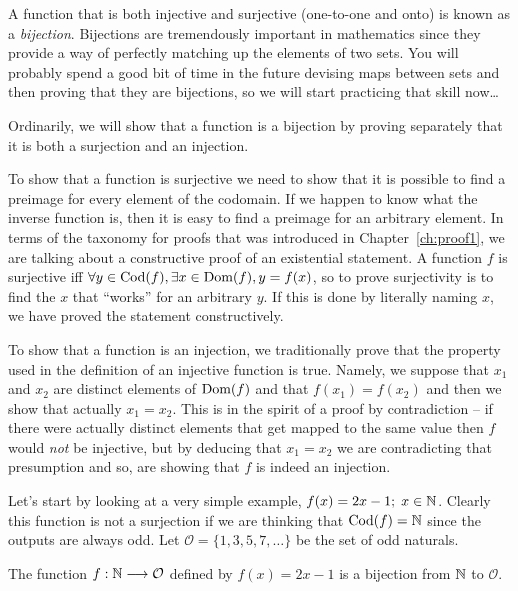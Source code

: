 A function that is both injective and surjective (one-to-one and onto)
is known as a \emph{bijection}.  Bijections are tremendously
important in mathematics since they provide a way of perfectly matching
up the elements of two sets.  You will probably spend a good bit of time 
in the future devising maps between sets and then proving that they are
bijections, so we will start practicing that skill now\ldots  

Ordinarily, we will show that a function is a bijection by proving 
separately that it is both a surjection and an injection.  
   
To show that a function is surjective we need to show that it is 
possible to find a preimage for every element of the codomain.  If
we happen to know what the inverse function is, then it is easy to
find a preimage for an arbitrary element.  In terms of the taxonomy
for proofs that was introduced in Chapter~\ref{ch:proof1}, we are talking
about a constructive proof of an existential statement.  A function $f$
is surjective iff $\forall y \in \mbox{Cod}(f), \exists x \in \mbox{Dom}(f), 
y = f(x)$, so to prove surjectivity is to find the $x$ that ``works'' for an 
arbitrary $y$.  If this is done by literally naming $x$, we have 
proved the statement constructively.

To show that a function
is an injection, we traditionally prove that the property used in the 
definition of an injective function is true.  Namely, we suppose that
$x_1$ and $x_2$ are distinct elements of $\mbox{Dom}(f)$ and that
$f(x_1)=f(x_2)$ and then we show that actually $x_1 = x_2$.  This is
in the spirit of a proof by contradiction -- if there were actually
distinct elements that get mapped to the same value then $f$ would \emph{not}
be injective, but by deducing that $x_1=x_2$ we are contradicting that 
presumption and so, are showing that $f$ is indeed an injection.

Let's start by looking at a very simple example, 
$f(x)=2x-1; \; x \in {\mathbb N}$.  Clearly this function 
is not a surjection if we are thinking that $\mbox{Cod}(f)={\mathbb N}$
since the outputs are always odd.  Let ${\mathcal O} = \{1, 3, 5, 7, \ldots \}$
be the set of odd naturals.

\begin{thm}
The function $f:{\mathbb N} \longrightarrow {\mathcal O}$ defined by
$f(x) = 2x-1$ is a bijection from ${\mathbb N}$ to ${\mathcal O}$.
\end{thm}

